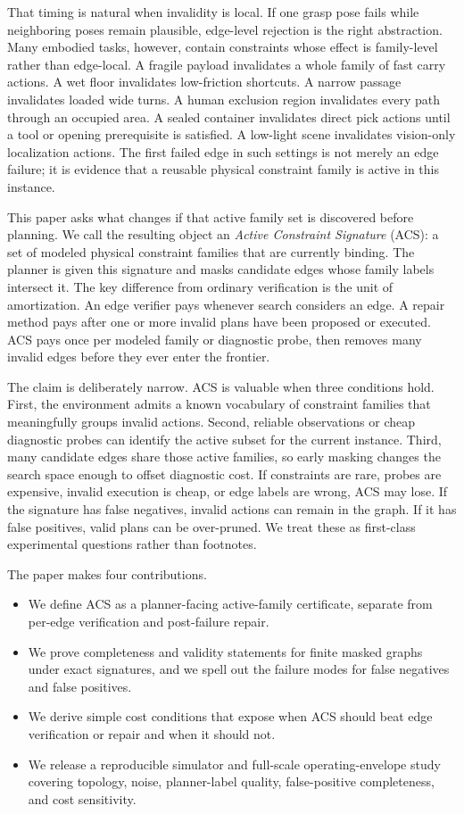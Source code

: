 \documentclass{article}
\newcommand{\ACS}{\textsc{ACS}}
\begin{document}
That timing is natural when invalidity is local. If one grasp pose fails while neighboring poses remain plausible, edge-level rejection is the right abstraction. Many embodied tasks, however, contain constraints whose effect is family-level rather than edge-local. A fragile payload invalidates a whole family of fast carry actions. A wet floor invalidates low-friction shortcuts. A narrow passage invalidates loaded wide turns. A human exclusion region invalidates every path through an occupied area. A sealed container invalidates direct pick actions until a tool or opening prerequisite is satisfied. A low-light scene invalidates vision-only localization actions. The first failed edge in such settings is not merely an edge failure; it is evidence that a reusable physical constraint family is active in this instance.

This paper asks what changes if that active family set is discovered before planning. We call the resulting object an \emph{Active Constraint Signature} (\ACS{}): a set of modeled physical constraint families that are currently binding. The planner is given this signature and masks candidate edges whose family labels intersect it. The key difference from ordinary verification is the unit of amortization. An edge verifier pays whenever search considers an edge. A repair method pays after one or more invalid plans have been proposed or executed. \ACS{} pays once per modeled family or diagnostic probe, then removes many invalid edges before they ever enter the frontier.

The claim is deliberately narrow. \ACS{} is valuable when three conditions hold. First, the environment admits a known vocabulary of constraint families that meaningfully groups invalid actions. Second, reliable observations or cheap diagnostic probes can identify the active subset for the current instance. Third, many candidate edges share those active families, so early masking changes the search space enough to offset diagnostic cost. If constraints are rare, probes are expensive, invalid execution is cheap, or edge labels are wrong, \ACS{} may lose. If the signature has false negatives, invalid actions can remain in the graph. If it has false positives, valid plans can be over-pruned. We treat these as first-class experimental questions rather than footnotes.

The paper makes four contributions.
\begin{itemize}
    \item We define \ACS{} as a planner-facing active-family certificate, separate from per-edge verification and post-failure repair.
    \item We prove completeness and validity statements for finite masked graphs under exact signatures, and we spell out the failure modes for false negatives and false positives.
    \item We derive simple cost conditions that expose when \ACS{} should beat edge verification or repair and when it should not.
    \item We release a reproducible simulator and full-scale operating-envelope study covering topology, noise, planner-label quality, false-positive completeness, and cost sensitivity.
\end{itemize}
\end{document}
